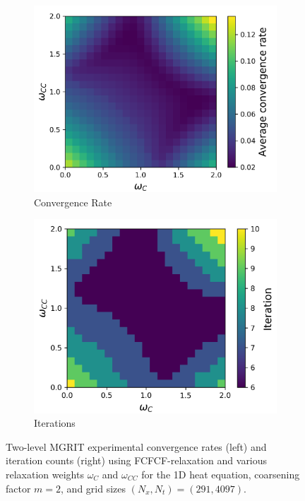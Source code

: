 \documentclass[VANCOUVER,STIX1COL]{WileyNJD-v2}
\begin{document}
\begin{figure}[h!]
    \centering
    \begin{subfigure}[b]{0.4\textwidth}
    \includegraphics[width=\textwidth]{images/Heat1D_4097_Conv.png}
    \caption{\normalsize Convergence Rate}
    \label{fig:Heat FCFCF Two Level Conv}
    \end{subfigure}
     \begin{subfigure}[b]{0.38\textwidth}
    \includegraphics[width=\textwidth]{images/Heat1D_4097_Iter.png}
    \caption{\normalsize Iterations}
    \label{fig:Heat FCFCF Two Level Iter}
    \end{subfigure}
    \caption{Two-level MGRIT experimental convergence rates (left) and iteration counts (right) using FCFCF-relaxation and various 
    relaxation weights $\omega_C$ and $\omega_{CC}$ for the 1D heat equation, coarsening factor $m = 2$, and grid sizes $(N_x, N_t) = (291, 4097)$.}
    \label{fig:Heat FCFCF Two Level}
\end{figure}
\end{document}
